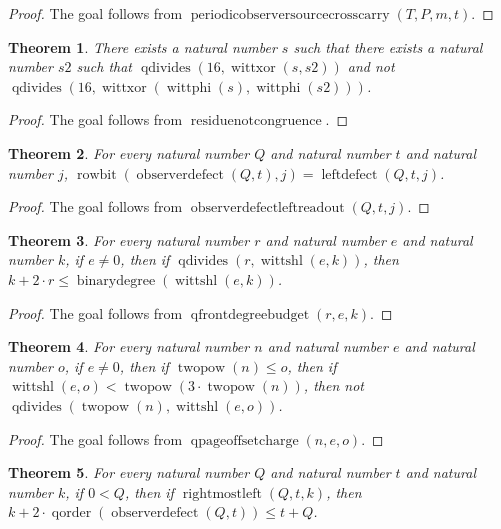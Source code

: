 \documentclass[11pt]{article}
\newtheorem{theorem}{Theorem}[section]
\theoremstyle{definition}
\begin{document}
\begin{proof}
The goal follows from \(\operatorname{periodicobserversourcecrosscarry}(T, P, m, t)\).
\end{proof}
\begin{theorem}
\label{ll:observations:residue-not-congruence}
There exists a natural number \(s\) such that there exists a natural number \(s2\) such that \(\operatorname{qdivides}(16, \operatorname{wittxor}(s, s2))\) and not \(\operatorname{qdivides}(16, \operatorname{wittxor}(\operatorname{wittphi}(s), \operatorname{wittphi}(s2)))\).
\end{theorem}
\begin{proof}
The goal follows from \(\operatorname{residuenotcongruence}\).
\end{proof}
\begin{theorem}
\label{ll:observations:observer-defect-left-readout}
For every natural number \(Q\) and natural number \(t\) and natural number \(j\), \(\operatorname{rowbit}(\operatorname{observerdefect}(Q, t), j) = \operatorname{leftdefect}(Q, t, j)\).
\end{theorem}
\begin{proof}
The goal follows from \(\operatorname{observerdefectleftreadout}(Q, t, j)\).
\end{proof}
\begin{theorem}
\label{ll:observations:q-front-degree-budget}
For every natural number \(r\) and natural number \(e\) and natural number \(k\), if \(e \ne 0\), then if \(\operatorname{qdivides}(r, \operatorname{wittshl}(e, k))\), then \(k + 2 \cdot r \le \operatorname{binarydegree}(\operatorname{wittshl}(e, k))\).
\end{theorem}
\begin{proof}
The goal follows from \(\operatorname{qfrontdegreebudget}(r, e, k)\).
\end{proof}
\begin{theorem}
\label{ll:observations:q-page-offset-charge}
For every natural number \(n\) and natural number \(e\) and natural number \(o\), if \(e \ne 0\), then if \(\operatorname{twopow}(n) \le o\), then if \(\operatorname{wittshl}(e, o) < \operatorname{twopow}(3 \cdot \operatorname{twopow}(n))\), then not \(\operatorname{qdivides}(\operatorname{twopow}(n), \operatorname{wittshl}(e, o))\).
\end{theorem}
\begin{proof}
The goal follows from \(\operatorname{qpageoffsetcharge}(n, e, o)\).
\end{proof}
\begin{theorem}
\label{ll:observations:observer-front-q-budget}
For every natural number \(Q\) and natural number \(t\) and natural number \(k\), if \(0 < Q\), then if \(\operatorname{rightmostleft}(Q, t, k)\), then \(k + 2 \cdot \operatorname{qorder}(\operatorname{observerdefect}(Q, t)) \le t + Q\).
\end{theorem}
\end{document}
